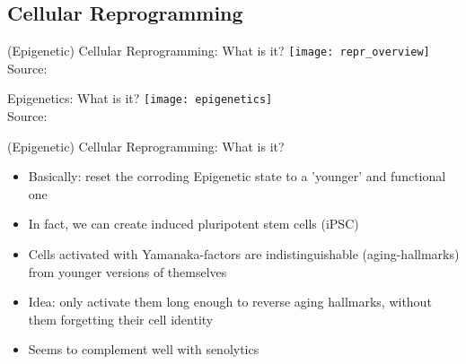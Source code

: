 \subsection{Cellular Reprogramming}

\begin{frame}[c]{(Epigenetic) Cellular Reprogramming: What is it?} 
    \texttt{[image: repr\_overview]} \\
    Source: \cite{ocampo2016vivo}
\end{frame}


\begin{frame}[c]{Epigenetics: What is it?}
    \texttt{[image: epigenetics]} \\
    Source: \cite{hollbacher2020seq}
\end{frame}

\begin{frame}[c]{(Epigenetic) Cellular Reprogramming: What is it?}
    \large
    \begin{itemize}[<+(1)->]
        \item Basically: reset the corroding Epigenetic state to a 'younger' and functional one
        \item In fact, we can create induced pluripotent stem cells (iPSC) \cite{takahashi2006induction}
        \item Cells activated with Yamanaka-factors are indistinguishable (aging-hallmarks) from younger versions of themselves
        \item Idea: only activate them long enough to reverse aging hallmarks, without them forgetting their cell identity
        \item Seems to complement well with senolytics \cite{ofenbauer2019strategies}
    \end{itemize}
\end{frame}

